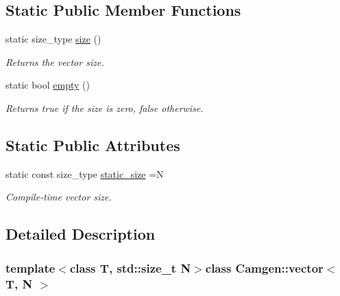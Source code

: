 \subsection*{Static Public Member Functions}
\begin{DoxyCompactItemize}
\item 
\hypertarget{a00579_a922fc7f84c5f4fc54a7dea44197771fb}{}static size\+\_\+type \hyperlink{a00579_a922fc7f84c5f4fc54a7dea44197771fb}{size} ()\label{a00579_a922fc7f84c5f4fc54a7dea44197771fb}

\begin{DoxyCompactList}\small\item\em Returns the vector size. \end{DoxyCompactList}\item 
\hypertarget{a00579_ae76cda59c96ae55ba8e2ed8d1e8c4a07}{}static bool \hyperlink{a00579_ae76cda59c96ae55ba8e2ed8d1e8c4a07}{empty} ()\label{a00579_ae76cda59c96ae55ba8e2ed8d1e8c4a07}

\begin{DoxyCompactList}\small\item\em Returns true if the size is zero, false otherwise. \end{DoxyCompactList}\end{DoxyCompactItemize}
\subsection*{Static Public Attributes}
\begin{DoxyCompactItemize}
\item 
\hypertarget{a00579_a3a494f18dfc722a0528bc01d5a6120ea}{}static const size\+\_\+type \hyperlink{a00579_a3a494f18dfc722a0528bc01d5a6120ea}{static\+\_\+size} =N\label{a00579_a3a494f18dfc722a0528bc01d5a6120ea}

\begin{DoxyCompactList}\small\item\em Compile-\/time vector size. \end{DoxyCompactList}\end{DoxyCompactItemize}


\subsection{Detailed Description}
\subsubsection*{template$<$class T, std\+::size\+\_\+t N$>$class Camgen\+::vector$<$ T, N $>$}

